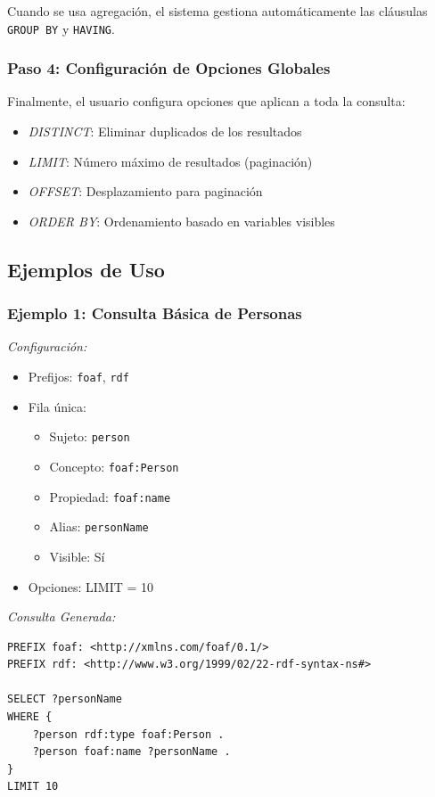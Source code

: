 \documentclass{article}
\begin{document}
Cuando se usa agregación, el sistema gestiona automáticamente las cláusulas \texttt{GROUP BY} y \texttt{HAVING}.

\subsubsection{Paso 4: Configuración de Opciones Globales}
\label{subsubsec:global-options}

Finalmente, el usuario configura opciones que aplican a toda la consulta:

\begin{itemize}
    \item \textit{DISTINCT}: Eliminar duplicados de los resultados
    \item \textit{LIMIT}: Número máximo de resultados (paginación)
    \item \textit{OFFSET}: Desplazamiento para paginación
    \item \textit{ORDER BY}: Ordenamiento basado en variables visibles
\end{itemize}

\subsection{Ejemplos de Uso}
\label{subsec:sparql-examples}

\subsubsection{Ejemplo 1: Consulta Básica de Personas}
\label{subsubsec:example-basic}

\textit{Configuración:}
\begin{itemize}
    \item Prefijos: \texttt{foaf}, \texttt{rdf}
    \item Fila única: 
    \begin{itemize}
        \item Sujeto: \texttt{person}
        \item Concepto: \texttt{foaf:Person}
        \item Propiedad: \texttt{foaf:name}
        \item Alias: \texttt{personName}
        \item Visible: Sí
    \end{itemize}
    \item Opciones: LIMIT = 10
\end{itemize}

\textit{Consulta Generada:}
\begin{verbatim}
PREFIX foaf: <http://xmlns.com/foaf/0.1/>
PREFIX rdf: <http://www.w3.org/1999/02/22-rdf-syntax-ns#>

SELECT ?personName
WHERE {
    ?person rdf:type foaf:Person .
    ?person foaf:name ?personName .
}
LIMIT 10
\end{verbatim}
\end{document}
